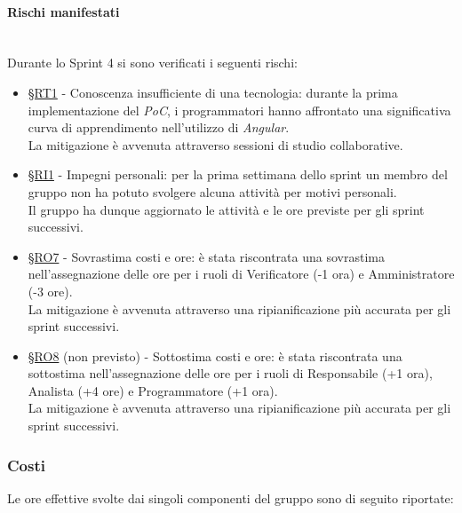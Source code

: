 \documentclass[10pt, letterpaper]{article}
\newcommand{\trisubsection}[1]{\paragraph{#1}\mbox{}\\}
\newcommand{\rif}[1]{\hyperref[#1]{§#1}}
\begin{document}
\trisubsection{Rischi manifestati}
Durante lo Sprint 4 si sono verificati i seguenti rischi:
\begin{itemize}
    \item \rif{RT1} - Conoscenza insufficiente di una tecnologia: durante la prima implementazione del \textit{PoC}, i programmatori hanno affrontato una significativa curva di apprendimento nell'utilizzo di \textit{Angular}.
          \\La mitigazione è avvenuta attraverso sessioni di studio collaborative.
    \item \rif{RI1} - Impegni personali: per la prima settimana dello sprint un membro del gruppo non ha potuto svolgere alcuna attività per motivi personali.
          \\Il gruppo ha dunque aggiornato le attività e le ore previste per gli sprint successivi.
    \item \rif{RO7} - Sovrastima costi e ore: è stata riscontrata una sovrastima nell'assegnazione delle ore per i ruoli di Verificatore (-1 ora) e Amministratore (-3 ore).
          \\La mitigazione è avvenuta attraverso una ripianificazione più accurata per gli sprint successivi.
    \item \rif{RO8} (non previsto) - Sottostima costi e ore: è stata riscontrata una sottostima nell'assegnazione delle ore per i ruoli di Responsabile (+1 ora), Analista (+4 ore) e Programmatore (+1 ora).
          \\La mitigazione è avvenuta attraverso una ripianificazione più accurata per gli sprint successivi.
\end{itemize}

\subsubsection{Costi}
Le ore effettive svolte dai singoli componenti del gruppo sono di seguito riportate:

\setRuoloFilippo{\Progr}
\setRuoloChristian{\Resp}
\setRuoloValeria{\Amm}
\setRuoloGiuseppe{\Amm}
\setRuoloFrancesco{\Verif}
\setRuoloLuca{\Progr}
\setRuoloLeonardo{\Anal}
\setRuoloVacante{\Proge}


\end{document}

